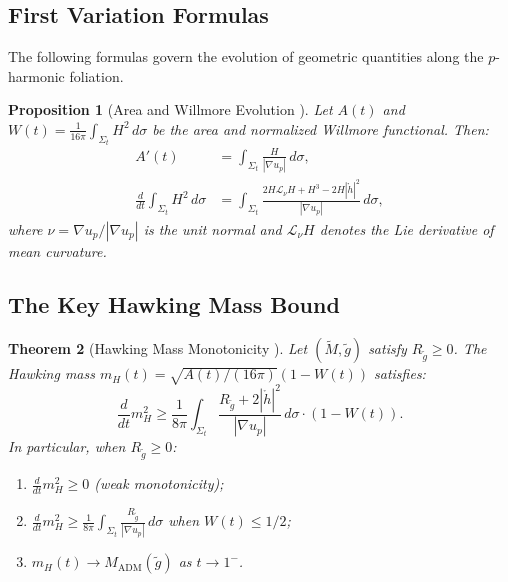 \documentclass[12pt]{article}
\theoremstyle{plain}
\newtheorem{theorem}{Theorem}[section]
\newtheorem{proposition}[theorem]{Proposition}
\theoremstyle{definition}
\theoremstyle{remark}
\newcommand{\ADM}{\mathrm{ADM}}
\newcommand{\tM}{\tilde{M}}
\newcommand{\tg}{\tilde{g}}
\begin{document}
\subsection{First Variation Formulas}

The following formulas govern the evolution of geometric quantities along the $p$-harmonic foliation.

\begin{proposition}[Area and Willmore Evolution {\cite[Proposition~3.2]{amo2022}}]\label{prop:area-willmore-app}
Let $A(t)$ and $W(t) = \frac{1}{16\pi}\int_{\Sigma_t} H^2\,d\sigma$ be the area and normalized Willmore functional. Then:
\begin{align}
A'(t) &= \int_{\Sigma_t} \frac{H}{|\nabla u_p|}\,d\sigma, \label{eq:area-deriv-app} \\
\frac{d}{dt}\int_{\Sigma_t} H^2\,d\sigma &= \int_{\Sigma_t} \frac{2H\mathcal{L}_\nu H + H^3 - 2H|\mathring{h}|^2}{|\nabla u_p|}\,d\sigma, \label{eq:willmore-deriv-app}
\end{align}
where $\nu = \nabla u_p/|\nabla u_p|$ is the unit normal and $\mathcal{L}_\nu H$ denotes the Lie derivative of mean curvature.
\end{proposition}

\subsection{The Key Hawking Mass Bound}

\begin{theorem}[Hawking Mass Monotonicity {\cite[Theorem~4.1]{amo2022}}]\label{thm:amo-hawking-app}
Let $(\tM, \tg)$ satisfy $R_{\tg} \geq 0$. The Hawking mass $m_H(t) = \sqrt{A(t)/(16\pi)}(1 - W(t))$ satisfies:
\begin{equation}\label{eq:amo-key-bound}
\frac{d}{dt}m_H^2 \geq \frac{1}{8\pi}\int_{\Sigma_t} \frac{R_{\tg} + 2|\mathring{h}|^2}{|\nabla u_p|}\,d\sigma \cdot (1 - W(t)).
\end{equation}
In particular, when $R_{\tg} \geq 0$:
\begin{enumerate}[label=\textup{(\roman*)}]
    \item $\frac{d}{dt}m_H^2 \geq 0$ (weak monotonicity);
    \item $\frac{d}{dt}m_H^2 \geq \frac{1}{8\pi}\int_{\Sigma_t} \frac{R_{\tg}}{|\nabla u_p|}\,d\sigma$ when $W(t) \leq 1/2$;
    \item $m_H(t) \to M_{\ADM}(\tg)$ as $t \to 1^-$.
\end{enumerate}
\end{theorem}
\end{document}
